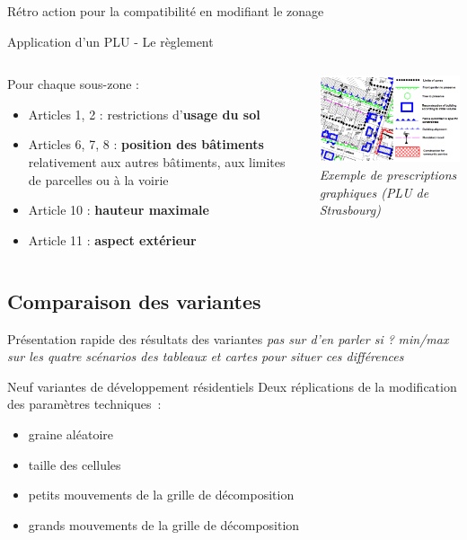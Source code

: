 \documentclass[xcolor=table]{beamer}
\begin{document}
\begin{frame}{Rétro action pour la compatibilité en modifiant le zonage}
	
\end{frame}

\begin{frame}{Application d'un PLU - Le règlement}
\begin{columns}[T]
\begin{column}[T]{5cm}
Pour chaque sous-zone : 
\begin{itemize}
\item Articles 1, 2 : restrictions d’\textbf{usage du sol}
\item Articles 6, 7, 8 : \textbf{position des bâtiments} relativement aux autres bâtiments, aux limites de parcelles ou à la voirie
\item Article 10 : \textbf{hauteur maximale}
\item Article 11 : \textbf{aspect extérieur}
\end{itemize}
\end{column}
\begin{column}[T]{5.5cm}
\centering
\includegraphics[width=6cm]{Images/codesplu.png}
\\
\textit{Exemple de prescriptions graphiques (PLU de Strasbourg)}
\end{column}
\end{columns}
\end{frame}

\subsection{Comparaison des variantes}

\begin{frame}{Présentation rapide des résultats des variantes}
\textit{pas sur d'en parler si ?}
\textit{min/max sur les quatre scénarios des tableaux et cartes pour situer ces différences}
\begin{block}{Neuf variantes de développement résidentiels}
	\vspace{0.1cm}
	Deux réplications de la modification des paramètres techniques~:
	\begin{itemize}
		\item graine aléatoire
		\item taille des cellules
		\item petits mouvements de la grille de décomposition
		\item grands mouvements de la grille de décomposition
	\end{itemize}
\end{block}
\end{frame}
\end{document}
